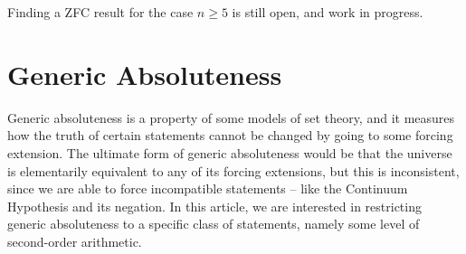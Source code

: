 \documentclass[10pt]{amsart}
\renewcommand\le\leqslant
\renewcommand\ge\geqslant
\newtheorem*{maintheorem*}{Main Theorem}
\theoremstyle{definition}
\begin{document}
Finding a ZFC result for the case $n\ge5$ is still open, and work in progress.


\section{Generic Absoluteness}\label{genabs}

Generic absoluteness is a property of some models of set theory, and it measures how the truth of certain statements cannot be changed by going to some forcing extension. The ultimate form of generic absoluteness would be that the universe is elementarily equivalent to any of its forcing extensions, but this is inconsistent, since we are able to force incompatible statements -- like the Continuum Hypothesis and its negation. In this article, we are interested in restricting generic absoluteness to a specific class of statements, namely some level of second-order arithmetic.
\end{document}
